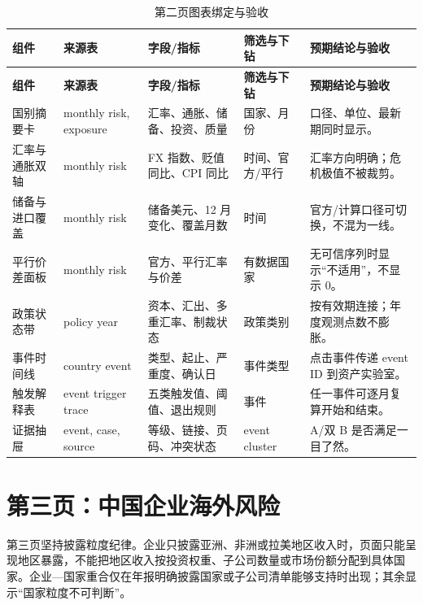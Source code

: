 \documentclass[UTF8,fontset=windows,12pt,openany]{ctexbook}
\begin{document}
\clearpage
\begin{landscape}
\begin{longtable}{p{3.3cm}p{3.5cm}p{4.4cm}p{3.2cm}p{4.5cm}}
\caption{第二页图表绑定与验收}\label{tab:page2-map}\\
\toprule
\textbf{组件} & \textbf{来源表} & \textbf{字段/指标} & \textbf{筛选与下钻} & \textbf{预期结论与验收}\\
\midrule
\endfirsthead
\toprule \textbf{组件} & \textbf{来源表} & \textbf{字段/指标} & \textbf{筛选与下钻} & \textbf{预期结论与验收}\\ \midrule
\endhead
国别摘要卡 & monthly risk, exposure & 汇率、通胀、储备、投资、质量 & 国家、月份 & 口径、单位、最新期同时显示。\\
汇率与通胀双轴 & monthly risk & FX 指数、贬值同比、CPI 同比 & 时间、官方/平行 & 汇率方向明确；危机极值不被裁剪。\\
储备与进口覆盖 & monthly risk & 储备美元、12 月变化、覆盖月数 & 时间 & 官方/计算口径可切换，不混为一线。\\
平行价差面板 & monthly risk & 官方、平行汇率与价差 & 有数据国家 & 无可信序列时显示“不适用”，不显示 0。\\
政策状态带 & policy year & 资本、汇出、多重汇率、制裁状态 & 政策类别 & 按有效期连接；年度观测点数不膨胀。\\
事件时间线 & country event & 类型、起止、严重度、确认日 & 事件类型 & 点击事件传递 event ID 到资产实验室。\\
触发解释表 & event trigger trace & 五类触发值、阈值、退出规则 & 事件 & 任一事件可逐月复算开始和结束。\\
证据抽屉 & event, case, source & 等级、链接、页码、冲突状态 & event cluster & A/双 B 是否满足一目了然。\\
\bottomrule
\end{longtable}
\end{landscape}

\chapter{第三页：中国企业海外风险}

第三页坚持披露粒度纪律。企业只披露亚洲、非洲或拉美地区收入时，页面只能呈现地区暴露，不能把地区收入按投资权重、子公司数量或市场份额分配到具体国家。企业—国家重合仅在年报明确披露国家或子公司清单能够支持时出现；其余显示“国家粒度不可判断”。
\end{document}
